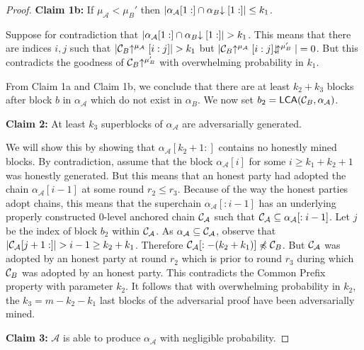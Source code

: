 \begin{proof}
    \textbf{Claim 1b: } If $\mu_\mathcal{A} < \mu_B'$ then
    $|\alpha_\mathcal{A}[1:] \cap \alpha_B\negthickspace\downarrow[1:]| \leq k_1$.

    Suppose for contradiction that
    $|\alpha_\mathcal{A}[1:] \cap \alpha_B\negthickspace\downarrow[1:]| > k_1$. This means
    that there are indices $i, j$ such that
    $|\mathcal{C}_B\negthickspace\uparrow^{\mu_\mathcal{A}}[i:j]| > k_1$ but
    $|\mathcal{C}_B\negthickspace\uparrow^{\mu_\mathcal{A}}[i:j]\negthickspace\downarrow\negthickspace\uparrow^{\mu_B'}| = 0$.
    But this contradicts the goodness of $\mathcal{C}_B\negthickspace\uparrow^{\mu_B'}$ with
    overwhelming probability in $k_1$.

    From Claim 1a and Claim 1b, we conclude that there are at least $k_2 + k_3$
    blocks after block $b$ in $\alpha_\mathcal{A}$ which do not exist in
    $\alpha_B$. We now set $b_2 = \textsf{LCA}(\mathcal{C}_B, \alpha_\mathcal{A})$.

    \textbf{Claim 2: } At least $k_3$ superblocks of $\alpha_\mathcal{A}$ are
    adversarially generated.

    We will show this by showing that $\alpha_\mathcal{A}[k_2 + 1:]$ contains
    no honestly mined blocks. By contradiction, assume that the block
    $\alpha_\mathcal{A}[i]$ for some $i \geq k_1 + k_2 + 1$ was honestly generated.
    But this means that an honest party had adopted the chain
    $\alpha_\mathcal{A}[i - 1]$ at some round $r_2 \leq r_3$. Because of the
    way the honest parties adopt chains, this means that the superchain
    $\alpha_\mathcal{A}[:i - 1]$ has an underlying properly constructed
    $0$-level anchored chain $\mathcal{C}_\mathcal{A}$ such that
    $\mathcal{C}_\mathcal{A} \subseteq \alpha_\mathcal{A}[:i - 1]$. Let $j$ be
    the index of block $b_2$ within $\mathcal{C}_\mathcal{A}$.  As
    $\alpha_\mathcal{A} \subseteq \mathcal{C}_\mathcal{A}$, observe that
    $|\mathcal{C}_\mathcal{A}[j + 1:]| > i -
    1 \geq k_2 + k_1$.  Therefore $\mathcal{C}_\mathcal{A}[:-(k_2 + k_1)] \not\preccurlyeq
    \mathcal{C}_B$.  But $\mathcal{C}_\mathcal{A}$ was adopted by an honest party at
    round $r_2$ which is prior to round $r_3$ during which $\mathcal{C}_B$ was
    adopted by an honest party. This contradicts the Common Prefix
    \cite{backbone} property with parameter $k_2$.
    It follows that with overwhelming probability in $k_2$, the $k_3 = m - k_2 -
    k_1$ last blocks of the adversarial proof have been adversarially mined.

    \textbf{Claim 3: } $\mathcal{A}$ is able to produce $\alpha_\mathcal{A}$
    with negligible probability.


\end{proof}
